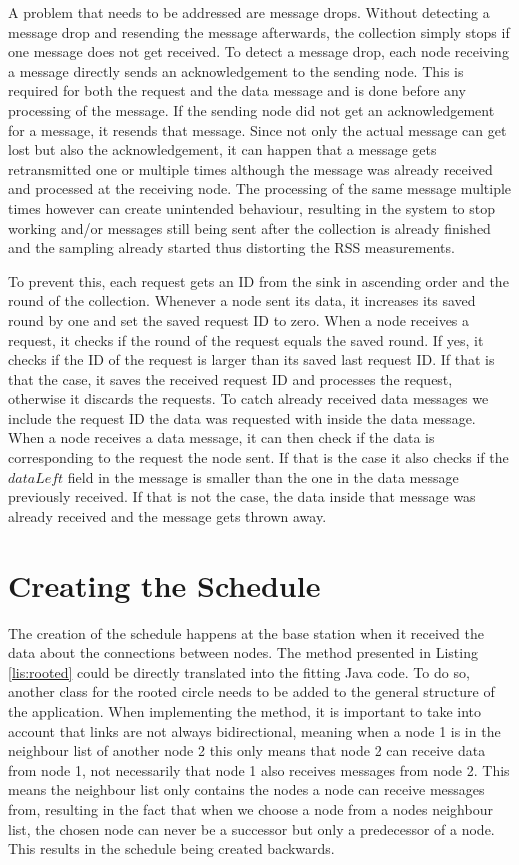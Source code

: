 A problem that needs to be addressed are message drops. Without detecting a message drop and resending the message afterwards, the collection simply stops if one message does not get received. To detect a message drop, each node receiving a message directly sends an acknowledgement to the sending node. This is required for both the request and the data message and is done before any processing of the message. If the sending node did not get an acknowledgement for a message, it resends that message. Since not only the actual message can get lost but also the acknowledgement, it can happen that a message gets retransmitted one or multiple times although the message was already received and processed at the receiving node. The processing of the same message multiple times however can create unintended behaviour, resulting in the system to stop working and/or messages still being sent after the collection is already finished and the sampling already started thus distorting the RSS measurements. 

To prevent this, each request gets an ID from the sink in ascending order and the round of the collection. Whenever a node sent its data, it increases its saved round by one and set the saved request ID to zero. When a node receives a request, it checks if the round of the request equals the saved round. If yes, it checks if the ID of the request is larger than its saved last request ID. If that is that the case, it saves the received request ID and processes the request, otherwise it discards the requests. To catch already received data messages we include the request ID the data was requested with inside the data message. When a node receives a data message, it can then check if the data is corresponding to the request the node sent. If that is the case it also checks if the $dataLeft$ field in the message is smaller than the one in the data message previously received. If that is not the case, the data inside that message was already received and the message gets thrown away. 

\section{Creating the Schedule}
The creation of the schedule happens at the base station when it received the data about the connections between nodes. The method presented in Listing \ref{lis:rooted} could be directly translated into the fitting Java code. To do so, another class for the rooted circle needs to be added to the general structure of the application. When implementing the method, it is important to take into account that links are not always bidirectional, meaning when a node 1 is in the neighbour list of another node 2 this only means that node 2 can receive data from node 1, not necessarily that node 1 also receives messages from node 2. This means the neighbour list only contains the nodes a node can receive messages from, resulting in the fact that when we choose a node from a nodes neighbour list, the chosen node can never be a successor but only a predecessor of a node. This results in the schedule being created backwards.

